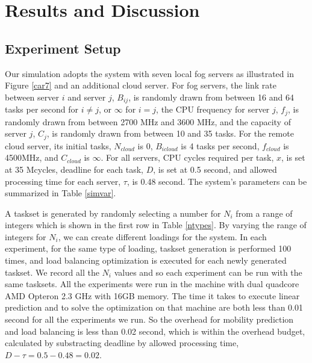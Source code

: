 

\section{Results and Discussion}
\label{s4}

\subsection{Experiment Setup}

Our simulation adopts the system with seven local fog servers as illustrated in Figure \ref{car7} and an additional cloud server. For fog servers, the link rate between server $i$ and server $j$, $B_{ij}$, is randomly drawn from between 16 and 64 tasks per second for $i\ne j$, or $\infty$ for $i=j$, the CPU frequency for server $j$, ${f_{j}}$, is randomly drawn from between 2700 MHz and 3600 MHz, and the capacity of server $j$, $C_{j}$,  is randomly drawn from between 10 and 35 tasks. For the remote cloud server, its initial tasks, $N_{cloud}$ is 0, $B_{icloud}$ is 4 tasks per second, ${f_{cloud}}$ is 4500MHz, and $C_{cloud}$ is $\infty$. For all servers, CPU cycles required per task, $x$, is set at 35 Mcycles, deadline for each task, $D$, is set at 0.5 second, and allowed processing time for each server, $\tau$, is 0.48 second. The system's parameters can be summarized in Table \ref{simvar}.

A taskset is generated by randomly selecting a number for $N_{i}$ from a range of integers which is shown in the first row in Table \ref{ntypes}. By varying the range of integers for $N_{i}$, we can create different loadings for the system. In each experiment, for the same type of loading, taskset generation is performed 100 times, and load balancing optimization is executed for each newly generated taskset. We record all the $N_{i}$ values and so each experiment can be run with the same tasksets. All the experiments were run in the machine with dual quadcore AMD Opteron 2.3 GHz with 16GB memory. The time it takes to execute linear prediction and to solve the optimization on that machine are both less than 0.01 second for all the experiments we run. So the overhead for mobility prediction and load balancing is less than 0.02 second, which is within the overhead budget, calculated by substracting deadline by allowed processing time, $D-\tau=0.5-0.48=0.02$.


